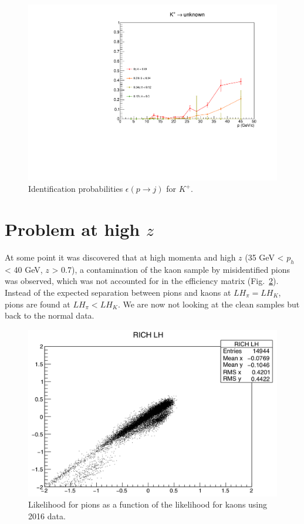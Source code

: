 \begin{figure}[!p]
  \includegraphics[scale=0.38]{./gfx/Kp_u.pdf}
	\caption{Identification probabilities $\epsilon(p \rightarrow j)$ for $K^+$.}
	\label{pic:Effkp}
\end{figure}

\newpage

\section{Problem at high $z$}

At some point it was discovered that at high momenta and high $z$ (35 GeV < $p_h$ < 40 GeV, $z$ > 0.7), a contamination of the kaon sample by misidentified pions was observed, which was not accounted for in the efficiency matrix (Fig.~\ref{pic:NonLin}). Instead of the expected separation between pions and kaons at $LH_{\pi} = LH_K$, pions are found at $LH_{\pi} < LH_K$. We are now not looking at the clean samples but back to the normal data.

\begin{figure}[!h]
  \centering
	\includegraphics[scale=0.35]{./gfx/RICHLH.png}
	\caption{Likelihood for pions as a function of the likelihood for kaons using 2016 data.}
	\label{pic:NonLin}
\end{figure}

